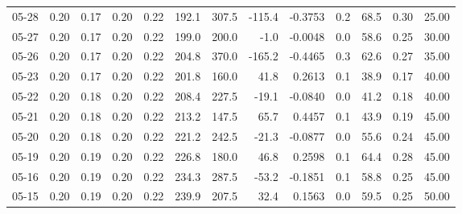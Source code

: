 \begin{threeparttable}
{\begin{tabular}{lrrrrrrrrrrrr}
  05-28 &          0.20 &          0.17 &          0.20 &        0.22 &               192.1 &               307.5 &     -115.4 &      -0.3753 &                 0.2 &             68.5 &            0.30 &                  25.00 \\
  05-27 &          0.20 &          0.17 &          0.20 &        0.22 &               199.0 &               200.0 &       -1.0 &      -0.0048 &                 0.0 &             58.6 &            0.25 &                  30.00 \\
  05-26 &          0.20 &          0.17 &          0.20 &        0.22 &               204.8 &               370.0 &     -165.2 &      -0.4465 &                 0.3 &             62.6 &            0.27 &                  35.00 \\
  05-23 &          0.20 &          0.17 &          0.20 &        0.22 &               201.8 &               160.0 &       41.8 &       0.2613 &                 0.1 &             38.9 &            0.17 &                  40.00 \\
  05-22 &          0.20 &          0.18 &          0.20 &        0.22 &               208.4 &               227.5 &      -19.1 &      -0.0840 &                 0.0 &             41.2 &            0.18 &                  40.00 \\
  05-21 &          0.20 &          0.18 &          0.20 &        0.22 &               213.2 &               147.5 &       65.7 &       0.4457 &                 0.1 &             43.9 &            0.19 &                  45.00 \\
  05-20 &          0.20 &          0.18 &          0.20 &        0.22 &               221.2 &               242.5 &      -21.3 &      -0.0877 &                 0.0 &             55.6 &            0.24 &                  45.00 \\
  05-19 &          0.20 &          0.19 &          0.20 &        0.22 &               226.8 &               180.0 &       46.8 &       0.2598 &                 0.1 &             64.4 &            0.28 &                  45.00 \\
  05-16 &          0.20 &          0.19 &          0.20 &        0.22 &               234.3 &               287.5 &      -53.2 &      -0.1851 &                 0.1 &             58.8 &            0.25 &                  45.00 \\
  05-15 &          0.20 &          0.19 &          0.20 &        0.22 &               239.9 &               207.5 &       32.4 &       0.1563 &                 0.0 &             59.5 &            0.25 &                  50.00 \\

\end{tabular}}
\end{threeparttable}
